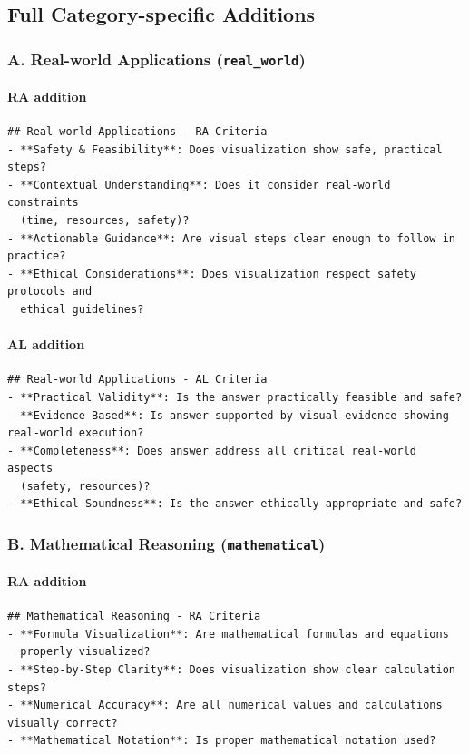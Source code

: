 \documentclass{article}
\theoremstyle{plain}
\theoremstyle{definition}
\theoremstyle{remark}
\begin{document}
\subsection{Full Category-specific Additions}

\subsubsection*{A. Real-world Applications (\texttt{real\_world})}
\paragraph{RA addition}
\begin{verbatim}
## Real-world Applications - RA Criteria
- **Safety & Feasibility**: Does visualization show safe, practical steps?
- **Contextual Understanding**: Does it consider real-world constraints
  (time, resources, safety)?
- **Actionable Guidance**: Are visual steps clear enough to follow in practice?
- **Ethical Considerations**: Does visualization respect safety protocols and
  ethical guidelines?
\end{verbatim}
\paragraph{AL addition}
\begin{verbatim}
## Real-world Applications - AL Criteria
- **Practical Validity**: Is the answer practically feasible and safe?
- **Evidence-Based**: Is answer supported by visual evidence showing real-world execution?
- **Completeness**: Does answer address all critical real-world aspects
  (safety, resources)?
- **Ethical Soundness**: Is the answer ethically appropriate and safe?
\end{verbatim}

\subsubsection*{B. Mathematical Reasoning (\texttt{mathematical})}
\paragraph{RA addition}
\begin{verbatim}
## Mathematical Reasoning - RA Criteria
- **Formula Visualization**: Are mathematical formulas and equations
  properly visualized?
- **Step-by-Step Clarity**: Does visualization show clear calculation steps?
- **Numerical Accuracy**: Are all numerical values and calculations visually correct?
- **Mathematical Notation**: Is proper mathematical notation used?
\end{verbatim}
\end{document}
